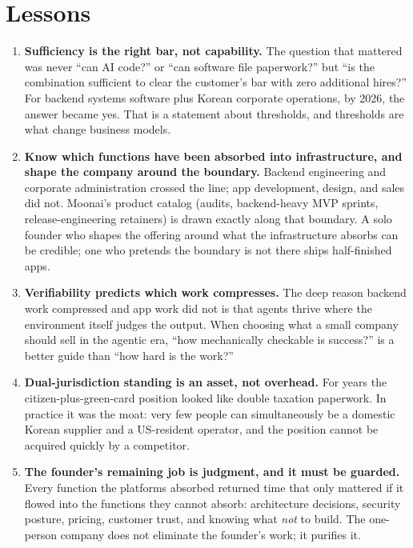 \documentclass{article}
\begin{document}
\section{Lessons}

\begin{enumerate}
    \item \textbf{Sufficiency is the right bar, not capability.} The question that mattered was never ``can AI code?'' or ``can software file paperwork?'' but ``is the combination sufficient to clear the customer's bar with zero additional hires?'' For backend systems software plus Korean corporate operations, by 2026, the answer became yes. That is a statement about thresholds, and thresholds are what change business models.
    \item \textbf{Know which functions have been absorbed into infrastructure, and shape the company around the boundary.} Backend engineering and corporate administration crossed the line; app development, design, and sales did not. Moonai's product catalog (audits, backend-heavy MVP sprints, release-engineering retainers) is drawn exactly along that boundary. A solo founder who shapes the offering around what the infrastructure absorbs can be credible; one who pretends the boundary is not there ships half-finished apps.
    \item \textbf{Verifiability predicts which work compresses.} The deep reason backend work compressed and app work did not is that agents thrive where the environment itself judges the output. When choosing what a small company should sell in the agentic era, ``how mechanically checkable is success?'' is a better guide than ``how hard is the work?''
    \item \textbf{Dual-jurisdiction standing is an asset, not overhead.} For years the citizen-plus-green-card position looked like double taxation paperwork. In practice it was the moat: very few people can simultaneously be a domestic Korean supplier and a US-resident operator, and the position cannot be acquired quickly by a competitor.
    \item \textbf{The founder's remaining job is judgment, and it must be guarded.} Every function the platforms absorbed returned time that only mattered if it flowed into the functions they cannot absorb: architecture decisions, security posture, pricing, customer trust, and knowing what \emph{not} to build. The one-person company does not eliminate the founder's work; it purifies it.
\end{enumerate}
\end{document}
